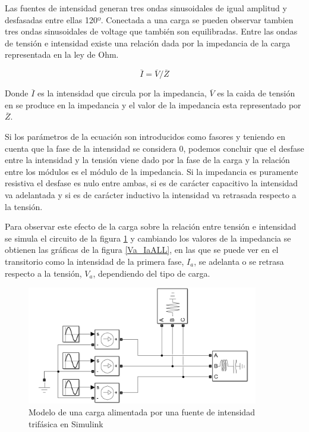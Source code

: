 \documentclass{book}
\begin{document}
Las fuentes de intensidad generan tres ondas sinusoidales de igual amplitud y desfasadas entre ellas 120º. Conectada a una carga se pueden observar tambien tres ondas sinusoidales de voltage que tambi\'en son equilibradas. Entre las ondas de tensi\'on e intensidad existe una relaci\'on dada por la impedancia de la carga representada en la ley de Ohm. \par

\begin{equation}\label{eq:ohm}
	\overline{I}=\overline{V}/\overline{Z}
\end{equation} \par

Donde $\overline{I}$ es la intensidad que circula por la impedancia, $\overline{V}$ es la caida de tensi\'on en se produce en la impedancia y el valor de la impedancia esta representado por $\overline{Z}$. \par

Si los par\'ametros de la ecuaci\'on son introducidos como fasores y teniendo en cuenta que la fase de la intensidad se considera 0, podemos concluir que el desfase entre la intensidad y la tensi\'on viene dado por la fase de la carga y la relaci\'on entre los m\'odulos es el m\'odulo de la impedancia. Si la impedancia es puramente resistiva el desfase es nulo entre ambas, si es de car\'acter capacitivo la intensidad va adelantada y si es de car\'acter inductivo la intensidad va retrasada respecto a la tensi\'on. \par

Para observar este efecto de la carga sobre la relaci\'on entre tensi\'on e intensidad se simula el circuito de la figura \ref{LoadAnalyserModel} y cambiando los valores de la impedancia se obtienen las gr\'aficas de la figura \ref {Va_IaALL}, en las que se puede ver en el transitorio como la intensidad de la primera fase, $I_a$,  se adelanta o se retrasa respecto a la tensi\'on, $V_a$, dependiendo del tipo de carga.  \par

\begin{figure}[h!]
\centering
\includegraphics[width=0.9\textwidth]{LoadAnalyserModel.PNG}
\caption{Modelo de una carga alimentada por una fuente de intensidad trif\'asica en Simulink}
\label{LoadAnalyserModel}
\end{figure}
\end{document}
